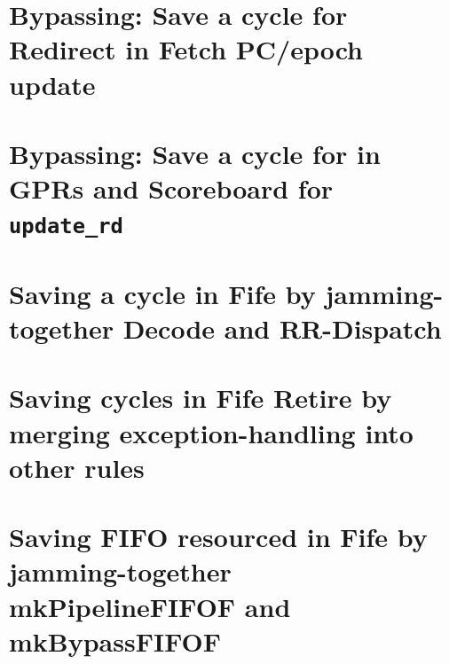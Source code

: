 
\section{Bypassing: Save a cycle for Redirect in Fetch PC/epoch update}


\section{Bypassing: Save a cycle for in GPRs and Scoreboard for {\tt update\_rd}}


\section{Saving a cycle in Fife by jamming-together Decode and RR-Dispatch}


\section{Saving cycles in Fife Retire by merging exception-handling into other rules}


\section{Saving FIFO resourced in Fife by jamming-together mkPipelineFIFOF and mkBypassFIFOF}

